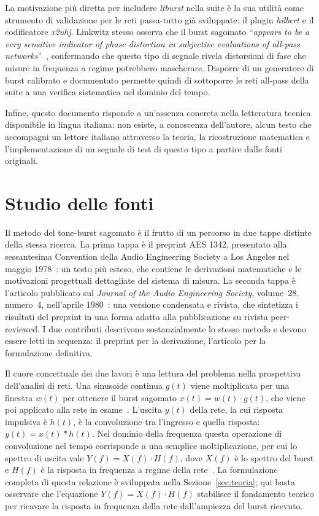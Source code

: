 \documentclass[11pt,a4paper]{article}
\begin{document}
La motivazione più diretta per includere \emph{ltburst} nella suite è la sua utilità come strumento di validazione per le reti passa-tutto già sviluppate: il plugin \emph{hilbert} e il codificatore \emph{x2uhj}.
Linkwitz stesso osserva che il burst sagomato ``\emph{appears to be a very sensitive indicator of phase distortion in subjective evaluations of all-pass networks}''~\cite{linkwitz1980shaped}, confermando che questo tipo di segnale rivela distorsioni di fase che misure in frequenza a regime potrebbero mascherare.
Disporre di un generatore di burst calibrato e documentato permette quindi di sottoporre le reti all-pass della suite a una verifica sistematica nel dominio del tempo.

Infine, questo documento risponde a un'assenza concreta nella letteratura tecnica disponibile in lingua italiana: non esiste, a conoscenza dell'autore, alcun testo che accompagni un lettore italiano attraverso la teoria, la ricostruzione matematica e l'implementazione di un segnale di test di questo tipo a partire dalle fonti originali.

\section{Studio delle fonti}\label{sec:fonti}

Il metodo del tone-burst sagomato è il frutto di un percorso in due tappe distinte della stessa ricerca.
La prima tappa è il preprint AES 1342, presentato alla sessantesima Convention della Audio Engineering Society a Los Angeles nel maggio 1978~\cite{linkwitz1978narrowband}: un testo più esteso, che contiene le derivazioni matematiche e le motivazioni progettuali dettagliate del sistema di misura.
La seconda tappa è l'articolo pubblicato sul \emph{Journal of the Audio Engineering Society}, volume~28, numero~4, nell'aprile 1980~\cite{linkwitz1980shaped}: una versione condensata e rivista, che sintetizza i risultati del preprint in una forma adatta alla pubblicazione su rivista peer-reviewed.
I due contributi descrivono sostanzialmente lo stesso metodo e devono essere letti in sequenza: il preprint per la derivazione, l'articolo per la formulazione definitiva.

Il cuore concettuale dei due lavori è una lettura del problema nella prospettiva dell'analisi di reti.
Una sinusoide continua $g(t)$ viene moltiplicata per una finestra $w(t)$ per ottenere il burst sagomato $x(t) = w(t) \cdot g(t)$, che viene poi applicato alla rete in esame~\cite{linkwitz1980shaped}.
L'uscita $y(t)$ della rete, la cui risposta impulsiva è $h(t)$, è la convoluzione tra l'ingresso e quella risposta: $y(t) = x(t) \ast h(t)$.
Nel dominio della frequenza questa operazione di convoluzione nel tempo corrisponde a una semplice moltiplicazione, per cui lo spettro di uscita vale $Y(f) = X(f) \cdot H(f)$, dove $X(f)$ è lo spettro del burst e $H(f)$ è la risposta in frequenza a regime della rete~\cite{linkwitz1980shaped}.
La formulazione completa di questa relazione è sviluppata nella Sezione~\ref{sec:teoria}; qui basta osservare che l'equazione $Y(f) = X(f) \cdot H(f)$ stabilisce il fondamento teorico per ricavare la risposta in frequenza della rete dall'ampiezza del burst ricevuto.
\end{document}
